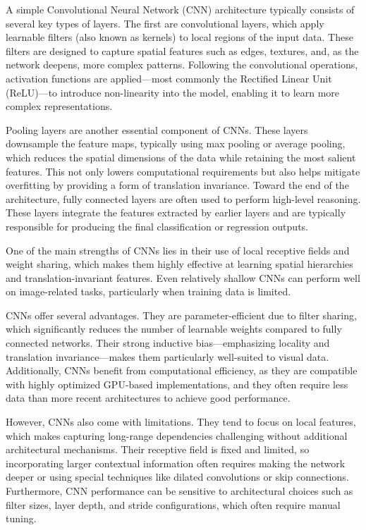 \documentclass[
  a4paper,
]{scrbook}
\begin{document}
A simple Convolutional Neural Network (CNN) architecture typically
consists of several key types of layers. The first are convolutional
layers, which apply learnable filters (also known as kernels) to local
regions of the input data. These filters are designed to capture spatial
features such as edges, textures, and, as the network deepens, more
complex patterns. Following the convolutional operations, activation
functions are applied---most commonly the Rectified Linear Unit
(ReLU)---to introduce non-linearity into the model, enabling it to learn
more complex representations.

Pooling layers are another essential component of CNNs. These layers
downsample the feature maps, typically using max pooling or average
pooling, which reduces the spatial dimensions of the data while
retaining the most salient features. This not only lowers computational
requirements but also helps mitigate overfitting by providing a form of
translation invariance. Toward the end of the architecture, fully
connected layers are often used to perform high-level reasoning. These
layers integrate the features extracted by earlier layers and are
typically responsible for producing the final classification or
regression outputs.

One of the main strengths of CNNs lies in their use of local receptive
fields and weight sharing, which makes them highly effective at learning
spatial hierarchies and translation-invariant features. Even relatively
shallow CNNs can perform well on image-related tasks, particularly when
training data is limited.

CNNs offer several advantages. They are parameter-efficient due to
filter sharing, which significantly reduces the number of learnable
weights compared to fully connected networks. Their strong inductive
bias---emphasizing locality and translation invariance---makes them
particularly well-suited to visual data. Additionally, CNNs benefit from
computational efficiency, as they are compatible with highly optimized
GPU-based implementations, and they often require less data than more
recent architectures to achieve good performance.

However, CNNs also come with limitations. They tend to focus on local
features, which makes capturing long-range dependencies challenging
without additional architectural mechanisms. Their receptive field is
fixed and limited, so incorporating larger contextual information often
requires making the network deeper or using special techniques like
dilated convolutions or skip connections. Furthermore, CNN performance
can be sensitive to architectural choices such as filter sizes, layer
depth, and stride configurations, which often require manual tuning.
\end{document}
